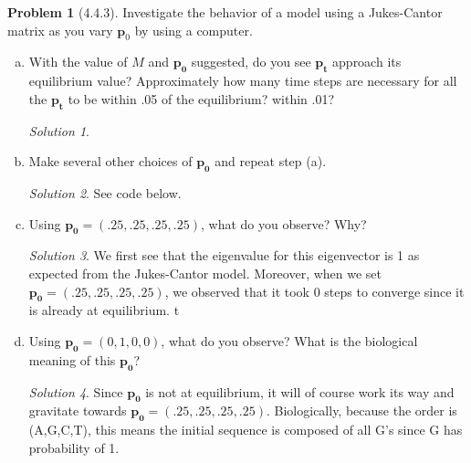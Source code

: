 \documentclass[11pt]{article}
\theoremstyle{definition}\newtheorem*{problem}{Problem}
\theoremstyle{remark}\newtheorem{claim}{Claim}
\theoremstyle{remark}\newtheorem*{sol}{Solution}
\begin{document}
\begin{problem}[4.4.3] 
Investigate the behavior of a model using a Jukes-Cantor matrix as you vary $\mathbf p_0$ by using a computer.\end{problem}
\begin{enumerate}[a.]
\item With the value of $M$ and $\mathbf {p_0}$ suggested, do you see $\mathbf {p_t}$ approach its equilibrium value? Approximately how many time steps are necessary for all the $\mathbf {p_t}$ to be within .05 of the equilibrium? within .01?
\begin{sol}

\end{sol}

\item Make several other choices of $\mathbf {p_0}$ and repeat step (a). 
\begin{sol} See code below.

\end{sol}

\item Using $\mathbf {p_0}= (.25,.25,.25,.25)$, what do you observe? Why?
\begin{sol}
We first see that the eigenvalue for this eigenvector is 1 as expected from the Jukes-Cantor model. Moreover, when we set $\mathbf {p_0}= (.25,.25,.25,.25)$, we observed that it took 0 steps to converge since it is already at equilibrium. t

\end{sol}

\item Using $\mathbf {p_0}= (0,1,0,0)$, what do you observe? What is the biological meaning of this $\mathbf {p_0}$?
\begin{sol}
Since $\mathbf {p_0}$ is not at equilibrium, it will of course work its way and gravitate towards $\mathbf {p_0}= (.25,.25,.25,.25)$. Biologically, because the order is (A,G,C,T), this means the initial sequence is composed of all G's since G has probability of 1.
\end{sol}
\end{enumerate}
\end{document}
